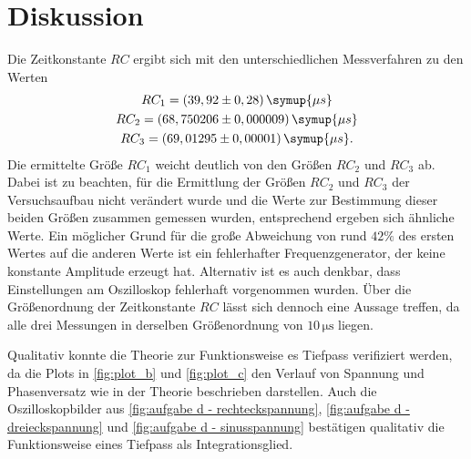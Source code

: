 \section{Diskussion}
\label{sec:Diskussion}
Die Zeitkonstante $RC$ ergibt sich mit den unterschiedlichen Messverfahren zu den Werten
\begin{gather}
    RC_{1} = (39,92\pm0,28)\, \symup{\mu s} \notag \\
    RC_{2} = (68,750206\pm0,000009)\,\symup{\mu s} \notag \\
    RC_{3} = (69,01295\pm0,00001)\,\symup{\mu s} \notag .
\end{gather}
Die ermittelte Größe $RC_{1}$ weicht deutlich von den Größen
$RC_{2}$ und $RC_{3}$ ab. Dabei ist zu beachten, für die Ermittlung der Größen $RC_{2}$ und $RC_{3}$
der Versuchsaufbau nicht verändert wurde und die Werte zur Bestimmung dieser beiden Größen zusammen gemessen wurden,
entsprechend ergeben sich ähnliche Werte. Ein möglicher Grund für die große Abweichung von rund $42\%$ des ersten Wertes 
auf die anderen Werte ist ein fehlerhafter
Frequenzgenerator, der keine konstante Amplitude erzeugt hat. Alternativ ist es auch denkbar, dass Einstellungen am Oszilloskop
fehlerhaft vorgenommen wurden.
Über die Größenordnung der Zeitkonstante $RC$ lässt sich dennoch eine Aussage treffen, da alle drei Messungen in derselben
Größenordnung von $10\,\unit{\micro\second}$ liegen.

Qualitativ konnte die Theorie zur Funktionsweise es Tiefpass verifiziert werden, da die Plots
in \autoref{fig:plot_b} und \autoref{fig:plot_c} den Verlauf von Spannung und Phasenversatz wie in der Theorie 
beschrieben darstellen.
Auch die Oszilloskopbilder aus \autoref{fig:aufgabe d - rechteckspannung}, \autoref{fig:aufgabe d - dreieckspannung}
und \autoref{fig:aufgabe d - sinusspannung} bestätigen qualitativ die Funktionsweise eines Tiefpass als Integrationsglied.
